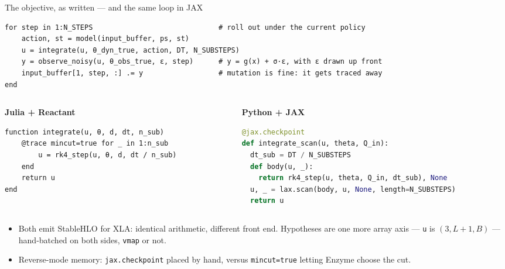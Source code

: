 \documentclass[aspectratio=169]{beamer}
\newcommand{\smallcode}{\ttfamily\fontsize{6.6}{7.9}\selectfont}
\begin{document}
\begin{frame}[fragile]{The objective, as written --- and the same loop in JAX}
\begin{lstlisting}
for step in 1:N_STEPS                              # roll out under the current policy
    action, st = model(input_buffer, ps, st)
    u = integrate(u, θ_dyn_true, action, DT, N_SUBSTEPS)
    y = observe_noisy(u, θ_obs_true, ε, step)      # y = g(x) + σ·ε, with ε drawn up front
    input_buffer[1, step, :] .= y                  # mutation is fine: it gets traced away
end
\end{lstlisting}

  \vspace{0.3em}
  \begin{columns}[t]
  \begin{column}{0.44\textwidth}
    {\scriptsize\textbf{Julia + Reactant}}
\begin{lstlisting}[basicstyle=\smallcode]
function integrate(u, θ, d, dt, n_sub)
    @trace mincut=true for _ in 1:n_sub
        u = rk4_step(u, θ, d, dt / n_sub)
    end
    return u
end
\end{lstlisting}
  \end{column}
  \begin{column}{0.54\textwidth}
    {\scriptsize\textbf{Python + JAX}}
\begin{lstlisting}[language=Python,basicstyle=\smallcode]
@jax.checkpoint
def integrate_scan(u, theta, Q_in):
  dt_sub = DT / N_SUBSTEPS
  def body(u, _):
    return rk4_step(u, theta, Q_in, dt_sub), None
  u, _ = lax.scan(body, u, None, length=N_SUBSTEPS)
  return u
\end{lstlisting}
  \end{column}
  \end{columns}

  {\footnotesize
  \begin{itemize}\setlength{\itemsep}{0.2em}
    \item Both emit StableHLO for XLA: identical arithmetic, different front end. Hypotheses are one
          more array axis --- \texttt{u} is $(3, L{+}1, B)$ --- hand-batched on both sides, \texttt{vmap} or not.
    \item Reverse-mode memory: \texttt{jax.checkpoint} placed by hand, versus \texttt{mincut=true}
          letting Enzyme choose the cut.
  \end{itemize}}
\end{frame}
\end{document}
